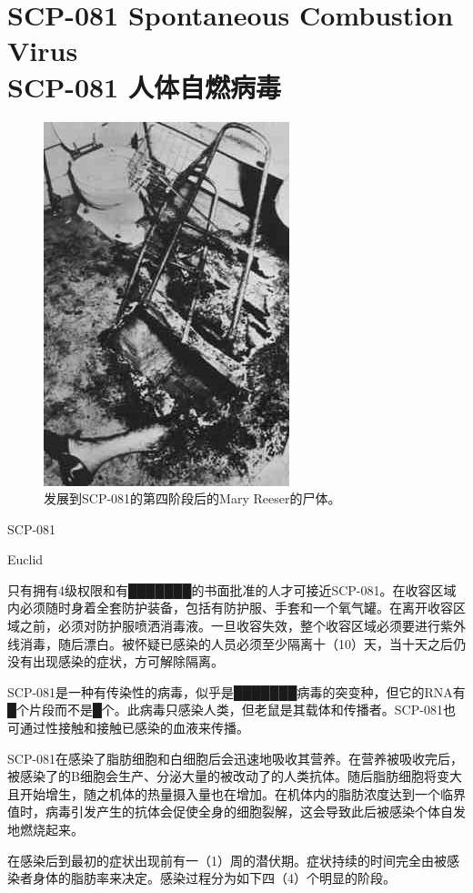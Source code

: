 \chapter[SCP-081 人体自燃病毒]{
    SCP-081 Spontaneous Combustion Virus\\
    SCP-081 人体自燃病毒
}

\label{chap:SCP-081}

\begin{figure}[H]
    \centering
    \includegraphics[width=0.4\linewidth]{images/SCP.081.jpg}
    \caption*{发展到SCP-081的第四阶段后的Mary Reeser的尸体。}
\end{figure}

SCP-081

Euclid

只有拥有4级权限和有███████的书面批准的人才可接近SCP-081。在收容区域内必须随时身着全套防护装备，包括有防护服、手套和一个氧气罐。在离开收容区域之前，必须对防护服喷洒消毒液。一旦收容失效，整个收容区域必须要进行紫外线消毒，随后漂白。被怀疑已感染的人员必须至少隔离十（10）天，当十天之后仍没有出现感染的症状，方可解除隔离。

SCP-081是一种有传染性的病毒，似乎是███████病毒的突变种，但它的RNA有█个片段而不是█个。此病毒只感染人类，但老鼠是其载体和传播者。SCP-081也可通过性接触和接触已感染的血液来传播。

SCP-081在感染了脂肪细胞和白细胞后会迅速地吸收其营养。在营养被吸收完后，被感染了的B细胞会生产、分泌大量的被改动了的人类抗体。随后脂肪细胞将变大且开始增生，随之机体的热量摄入量也在增加。在机体内的脂肪浓度达到一个临界值时，病毒引发产生的抗体会促使全身的细胞裂解，这会导致此后被感染个体自发地燃烧起来。

在感染后到最初的症状出现前有一（1）周的潜伏期。症状持续的时间完全由被感染者身体的脂肪率来决定。感染过程分为如下四（4）个明显的阶段。

